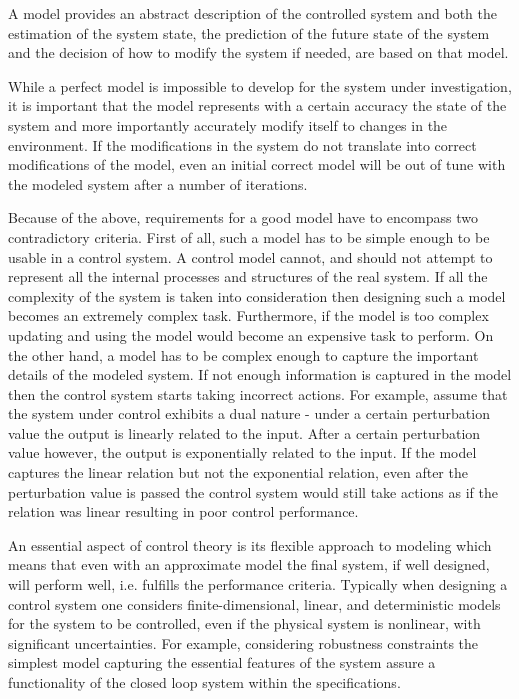 A model provides an abstract description of the controlled system and both the estimation of the system state, the prediction of the future state of the system and the decision of how to modify the system if needed, are based on that model. 

While a perfect model is impossible to develop for the system under investigation, it is important that the model represents with a certain accuracy  the state of the system and more importantly accurately modify itself to changes in the environment. If the modifications in the system do not translate into correct modifications of the model, even an initial correct model will be out of tune with the modeled system after a number of iterations. 

Because of the above, requirements for a good model have to encompass two contradictory criteria. First of all, such a model has to be simple enough to be usable in a control system. A control model cannot, and should not attempt to represent all the internal processes and structures of the real system. If all the complexity of the system is taken into consideration then designing such a model becomes an extremely complex task. Furthermore, if the model is too complex updating and using the model would become an expensive task to perform. On the other hand, a model has to be complex enough to capture the important details of the modeled system. If not enough information is captured in the model then the control system starts taking incorrect actions. For example, assume that the system under control exhibits a dual nature - under a certain perturbation value the output is linearly related to the input. After a certain perturbation value however, the output is exponentially related to the input. If the model captures the linear relation but not the exponential relation, even after the perturbation value is passed the control system would still take actions as if the relation was linear resulting in poor control performance.

An essential aspect of control theory is its flexible approach to modeling which means that even with an approximate model the final system, if well designed, will perform well, i.e. fulfills the performance criteria. Typically when designing a control system one considers finite-dimensional, linear, and deterministic models for the system to be controlled, even if the physical system is  nonlinear, with significant uncertainties. For example, considering robustness constraints the simplest model capturing the essential features of the system assure a functionality of the closed loop system within the specifications.

